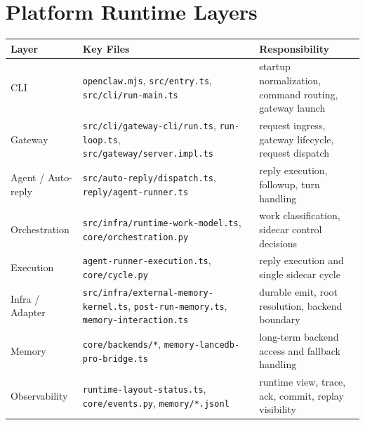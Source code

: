 \documentclass[11pt,a4paper,oneside,openany]{book}
\begin{document}
\section{Platform Runtime Layers}
\begin{longtable}{p{}p{}p{}}
\toprule
\textbf{Layer} & \textbf{Key Files} & \textbf{Responsibility}\\
\midrule
\endhead
CLI & \texttt{openclaw.mjs}, \texttt{src/entry.ts}, \texttt{src/cli/run-main.ts} & startup normalization, command routing, gateway launch\\
Gateway & \texttt{src/cli/gateway-cli/run.ts}, \texttt{run-loop.ts}, \texttt{src/gateway/server.impl.ts} & request ingress, gateway lifecycle, request dispatch\\
Agent / Auto-reply & \texttt{src/auto-reply/dispatch.ts}, \texttt{reply/agent-runner.ts} & reply execution, followup, turn handling\\
Orchestration & \texttt{src/infra/runtime-work-model.ts}, \texttt{core/orchestration.py} & work classification, sidecar control decisions\\
Execution & \texttt{agent-runner-execution.ts}, \texttt{core/cycle.py} & reply execution and single sidecar cycle\\
Infra / Adapter & \texttt{src/infra/external-memory-kernel.ts}, \texttt{post-run-memory.ts}, \texttt{memory-interaction.ts} & durable emit, root resolution, backend boundary\\
Memory & \texttt{core/backends/*}, \texttt{memory-lancedb-pro-bridge.ts} & long-term backend access and fallback handling\\
Observability & \texttt{runtime-layout-status.ts}, \texttt{core/events.py}, \texttt{memory/*.jsonl} & runtime view, trace, ack, commit, replay visibility\\
\bottomrule
\end{longtable}
\end{document}
